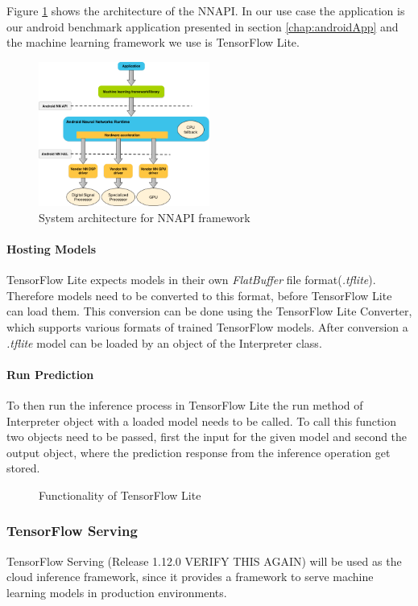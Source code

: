 Figure \ref{fig:NNAPIarchitecture} shows the architecture of the NNAPI. In our use case the application is our android benchmark application presented in section \ref{chap:androidApp} and the machine learning framework we use is TensorFlow Lite.
\begin{figure}[!htb]
\centering
\includegraphics[width=0.5\textwidth]{./Bilder/nnapi_architecture.png}
\caption{System architecture for NNAPI framework \cite{NNAPI}}
\label{fig:NNAPIarchitecture}
\end{figure}


\paragraph{Hosting Models}
TensorFlow Lite expects models in their own \emph{FlatBuffer} file  format(\emph{.tflite}). Therefore models need to be converted to this format, before TensorFlow Lite can load them. This conversion can be done using the TensorFlow Lite Converter, which supports various formats of trained TensorFlow models.
After conversion a \emph{.tflite} model can be loaded by an object of the Interpreter class.
\paragraph{Run Prediction}

To then run the inference process in TensorFlow Lite the run method of Interpreter object with a loaded model needs to be called. To call this function two objects need to be passed, first the input for the given model and second the output object, where the prediction response from the inference operation get stored. 
\begin{figure}[H]
\centering

\caption{Functionality of TensorFlow Lite}
\label{fig:edge}
\end{figure}
\subsubsection{TensorFlow Serving}
\label{chap:TFServing}
TensorFlow Serving (Release 1.12.0 VERIFY THIS AGAIN) will be used as the cloud inference framework, since it provides a framework to serve machine learning models in production environments. 



